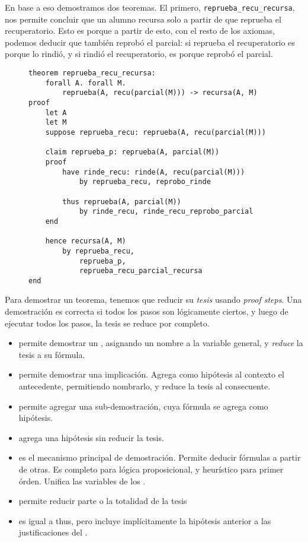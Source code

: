 En base a eso demostramos dos teoremas. El primero,
\texttt{reprueba\_recu\_recursa}, nos permite concluir que un alumno recursa
solo a partir de que reprueba el recuperatorio. Esto es porque a partir de esto,
con el resto de los axiomas, podemos deducir que también reprobó el parcial: si
reprueba el recuperatorio es porque lo rindió, y si rindió el recuperatorio, es
porque reprobó el parcial.

\begin{figure}[H]
\begin{lstlisting}[language=PPA]
theorem reprueba_recu_recursa:
    forall A. forall M.
        reprueba(A, recu(parcial(M))) -> recursa(A, M)
proof
    let A
    let M
    suppose reprueba_recu: reprueba(A, recu(parcial(M)))

    claim reprueba_p: reprueba(A, parcial(M))
    proof
        have rinde_recu: rinde(A, recu(parcial(M)))
            by reprueba_recu, reprobo_rinde

        thus reprueba(A, parcial(M))
            by rinde_recu, rinde_recu_reprobo_parcial
    end

    hence recursa(A, M)
        by reprueba_recu,
            reprueba_p,
            reprueba_recu_parcial_recursa
end
\end{lstlisting}
\end{figure}

Para demostrar un teorema, tenemos que reducir su \textit{tesis} usando
\textit{proof steps}. Una demostración es correcta si todos los pasos son
lógicamente ciertos, y luego de ejecutar todos los pasos, la tesis se reduce por completo.

\begin{itemize}
    \item \cmdLet{} permite demostrar un \kwForall{}, asignando un nombre
    a la variable general, y \textit{reduce} la tesis a su fórmula.
    \item \cmdSuppose{} permite demostrar una implicación. Agrega como
    hipótesis al contexto el antecedente, permitiendo nombrarlo, y reduce la
    tesis al consecuente.
    \item \cmdClaim{} permite agregar una sub-demostración, cuya fórmula se
    agrega como hipótesis.
    \item \cmdHave{} agrega una hipótesis sin reducir la tesis.
    \item \cmdBy{} es el mecanismo principal de demostración. Permite deducir
    fórmulas a partir de otras. Es completo para lógica proposicional, y
    heurístico para primer órden. Unifica las variables de los \kwForall{}.
    \item \cmdThus{} permite reducir parte o la totalidad de la tesis
    \item \cmdHence{} es igual a thus, pero incluye implícitamente la
    hipótesis anterior a las justificaciones del \cmdBy{}.
\end{itemize}

